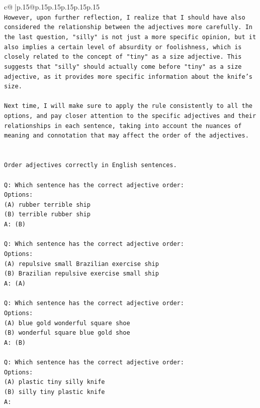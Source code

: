 \documentclass{article}
\begin{document}
{\begin{supertabular}{c@{$\;$}|p{.15\linewidth}@{}p{.15\linewidth}p{.15\linewidth}p{.15\linewidth}p{.15\linewidth}p{.15\linewidth}}
{{{\\ 
\texttt{However, upon further reflection, I realize that I should have also considered the relationship between the adjectives more carefully. In the last question, "silly" is not just a more specific opinion, but it also implies a certain level of absurdity or foolishness, which is closely related to the concept of "tiny" as a size adjective. This suggests that "silly" should actually come before "tiny" as a size adjective, as it provides more specific information about the knife's size.} \\
\\ 
\texttt{Next time, I will make sure to apply the rule consistently to all the options, and pay closer attention to the specific adjectives and their relationships in each sentence, taking into account the nuances of meaning and connotation that may affect the order of the adjectives.} \\
\\ 
\\ 
\texttt{Order adjectives correctly in English sentences.} \\
\\ 
\texttt{Q: Which sentence has the correct adjective order:} \\
\texttt{Options:} \\
\texttt{(A) rubber terrible ship} \\
\texttt{(B) terrible rubber ship} \\
\texttt{A: (B)} \\
\\ 
\texttt{Q: Which sentence has the correct adjective order:} \\
\texttt{Options:} \\
\texttt{(A) repulsive small Brazilian exercise ship} \\
\texttt{(B) Brazilian repulsive exercise small ship} \\
\texttt{A: (A)} \\
\\ 
\texttt{Q: Which sentence has the correct adjective order:} \\
\texttt{Options:} \\
\texttt{(A) blue gold wonderful square shoe} \\
\texttt{(B) wonderful square blue gold shoe} \\
\texttt{A: (B)} \\
\\ 
\texttt{Q: Which sentence has the correct adjective order:} \\
\texttt{Options:} \\
\texttt{(A) plastic tiny silly knife} \\
\texttt{(B) silly tiny plastic knife} \\
\texttt{A:} \\
            }
        }
    }
     \\ \\


\end{supertabular}}
\end{document}
